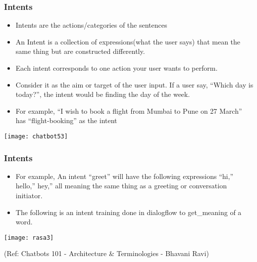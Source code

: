  \begin{frame}[fragile]\frametitle{Intents}
\begin{itemize}
\item Intents are the actions/categories of the sentences
\item An Intent is a collection of expressions(what the user says) that mean the same thing but are constructed differently. \item Each intent corresponds to one action your user wants to perform.
\item Consider it as the aim or target of the user input. If a user say, ``Which day is today?'', the intent would be finding the day of the week.
\item For example, ``I wish to book a flight from Mumbai to Pune on 27 March'' has ``flight-booking'' as the intent 
\end{itemize}

\begin{center}
\texttt{[image: chatbot53]}
\end{center}

\end{frame}


 \begin{frame}[fragile]\frametitle{Intents}
\begin{itemize}
\item For example, An intent ``greet'' will have the following expressions ``hi,'' hello,'' hey,'' all meaning the same thing as a greeting or conversation initiator.
\item The following is an intent training done in dialogflow to get\_meaning of a word.
\end{itemize}

\begin{center}
\texttt{[image: rasa3]}
\end{center}

{\tiny (Ref: Chatbots 101 - Architecture \& Terminologies -  Bhavani Ravi)}

\end{frame}


